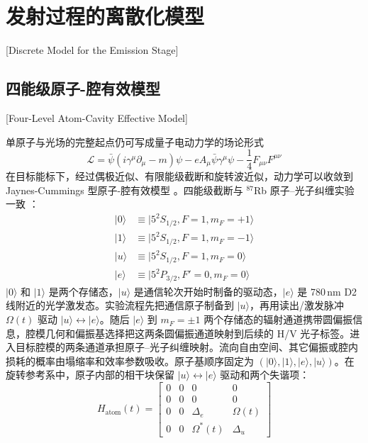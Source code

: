 \section{发射过程的离散化模型}[Discrete Model for the Emission Stage]

\subsection{四能级原子-腔有效模型}[Four-Level Atom-Cavity Effective Model]

单原子与光场的完整起点仍可写成量子电动力学的场论形式
\begin{equation}
\mathcal{L}=\bar{\psi}\left(i\gamma^\mu\partial_\mu-m\right)\psi-eA_\mu\bar{\psi}\gamma^\mu\psi-\frac{1}{4}F_{\mu\nu}F^{\mu\nu}
\end{equation}
在目标能标下，经过偶极近似、有限能级截断和旋转波近似，动力学可以收敛到 Jaynes-Cummings 型原子-腔有效模型 \cite{JaynesCummings1963,ReisererRempe2015CavityNetworks}。四能级截断与 $^{87}$Rb 原子--光子纠缠实验一致 \cite{Ritter2012ElementaryQuantumNetwork,vanleent2022entangling}：
\begin{align}
|0\rangle &\equiv |5^2S_{1/2},F=1,m_F=+1\rangle\\
|1\rangle &\equiv |5^2S_{1/2},F=1,m_F=-1\rangle\\
|u\rangle &\equiv |5^2S_{1/2},F=1,m_F=0\rangle\\
|e\rangle &\equiv |5^2P_{3/2},F'=0,m_F=0\rangle
\end{align}
$|0\rangle$ 和 $|1\rangle$ 是两个存储态，$|u\rangle$ 是通信轮次开始时制备的驱动态，$|e\rangle$ 是 780\,nm D2 线附近的光学激发态。实验流程先把通信原子制备到 $|u\rangle$，再用读出/激发脉冲 $\Omega(t)$ 驱动 $|u\rangle\leftrightarrow |e\rangle$。随后 $|e\rangle$ 到 $m_F=\pm1$ 两个存储态的辐射通道携带圆偏振信息，腔模几何和偏振基选择把这两条圆偏振通道映射到后续的 H/V 光子标签。进入目标腔模的两条通道承担原子--光子纠缠映射。流向自由空间、其它偏振或腔内损耗的概率由塌缩率和效率参数吸收。原子基顺序固定为 $(|0\rangle,|1\rangle,|e\rangle,|u\rangle)$。在旋转参考系中，原子内部的相干块保留 $|u\rangle \leftrightarrow |e\rangle$ 驱动和两个失谐项：
\begin{equation}
H_{\mathrm{atom}}(t)=
\begin{bmatrix}
0&0&0&0\\
0&0&0&0\\
0&0&\Delta_e&\Omega(t)\\
0&0&\Omega^*(t)&\Delta_u
\end{bmatrix}
\label{eq:h-atom-4level}
\end{equation}
